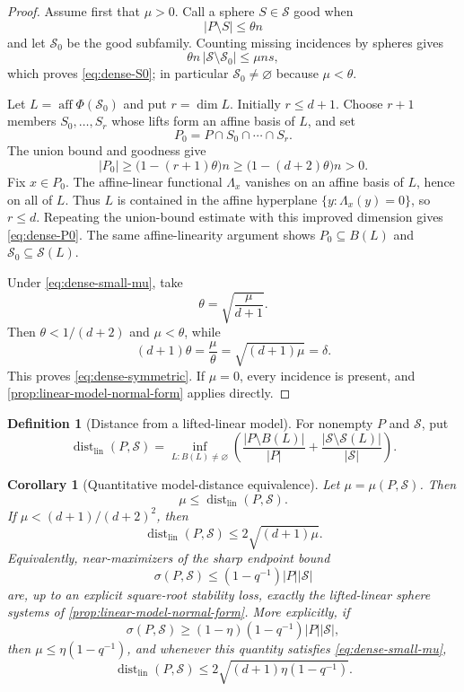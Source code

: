 \documentclass[11pt,letterpaper]{amsart}
\newtheorem{corollary}[corollary]{Corollary}
\theoremstyle{definition}
\newtheorem{definition}[definition]{Definition}
\theoremstyle{remark}
\newcommand{\1}{\mathbf 1}
\begin{document}
\begin{proof}
Assume first that $\mu>0$.  Call a sphere $S\in\mathcal S$ good when
\[
 |P\setminus S|\le\theta n
\]
and let $\mathcal S_0$ be the good subfamily.  Counting missing incidences by spheres gives
\[
 \theta n\,|\mathcal S\setminus\mathcal S_0|
 \le \mu ns,
\]
which proves \eqref{eq:dense-S0}; in particular $\mathcal S_0\ne\varnothing$ because $\mu<\theta$.

Let $L=\operatorname{aff}\Phi(\mathcal S_0)$ and put $r=\dim L$.  Initially $r\le d+1$.  Choose $r+1$ members $S_0,\ldots,S_r$ whose lifts form an affine basis of $L$, and set
\[
 P_0=P\cap S_0\cap\cdots\cap S_r.
\]
The union bound and goodness give
\[
 |P_0|\ge\bigl(1-(r+1)\theta\bigr)n
 \ge\bigl(1-(d+2)\theta\bigr)n>0.
\]
Fix $x\in P_0$.  The affine-linear functional $\Lambda_x$ vanishes on an affine basis of $L$, hence on all of $L$.  Thus $L$ is contained in the affine hyperplane $\{y:\Lambda_x(y)=0\}$, so $r\le d$.  Repeating the union-bound estimate with this improved dimension gives \eqref{eq:dense-P0}.  The same affine-linearity argument shows $P_0\subseteq B(L)$ and $\mathcal S_0\subseteq\mathcal S(L)$.

Under \eqref{eq:dense-small-mu}, take
\[
 \theta=\sqrt{\frac\mu{d+1}}.
\]
Then $\theta<1/(d+2)$ and $\mu<\theta$, while
\[
 (d+1)\theta=\frac\mu\theta=\sqrt{(d+1)\mu}=\delta.
\]
This proves \eqref{eq:dense-symmetric}.  If $\mu=0$, every incidence is present, and \cref{prop:linear-model-normal-form} applies directly.
\end{proof}

\begin{definition}[Distance from a lifted-linear model]\label{def:linear-distance}
For nonempty $P$ and $\mathcal S$, put
\[
 \operatorname{dist}_{\mathrm{lin}}(P,\mathcal S)
 =\inf_{L:B(L)\ne\varnothing}
 \left(
 \frac{|P\setminus B(L)|}{|P|}
 +\frac{|\mathcal S\setminus\mathcal S(L)|}{|\mathcal S|}
 \right).
\]
\end{definition}

\begin{corollary}[Quantitative model-distance equivalence]\label{cor:model-distance}
Let $\mu=\mu(P,\mathcal S)$.  Then
\begin{equation}\label{eq:model-distance-lower}
 \mu\le\operatorname{dist}_{\mathrm{lin}}(P,\mathcal S).
\end{equation}
If $\mu<(d+1)/(d+2)^2$, then
\begin{equation}\label{eq:model-distance-upper}
 \operatorname{dist}_{\mathrm{lin}}(P,\mathcal S)
 \le2\sqrt{(d+1)\mu}.
\end{equation}
Equivalently, near-maximizers of the sharp endpoint bound
\[
 \sigma(P,\mathcal S)\le(1-q^{-1})|P||\mathcal S|
\]
are, up to an explicit square-root stability loss, exactly the lifted-linear sphere systems of \cref{prop:linear-model-normal-form}.  More explicitly, if
\[
 \sigma(P,\mathcal S)\ge(1-\eta)(1-q^{-1})|P||\mathcal S|,
\]
then $\mu\le\eta(1-q^{-1})$, and whenever this quantity satisfies \eqref{eq:dense-small-mu},
\[
 \operatorname{dist}_{\mathrm{lin}}(P,\mathcal S)
 \le2\sqrt{(d+1)\eta(1-q^{-1})}.
\]
\end{corollary}
\end{document}

